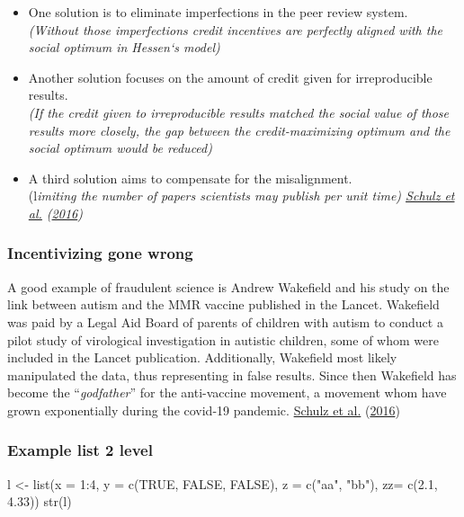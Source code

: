 \documentclass[
  12pt,
  norsk,
]{article}
\newenvironment{Shaded}{\begin{snugshade}}{\end{snugshade}}
\newcommand{\AttributeTok}[1]{\textcolor[rgb]{0.77,0.63,0.00}{#1}}
\newcommand{\ConstantTok}[1]{\textcolor[rgb]{0.00,0.00,0.00}{#1}}
\newcommand{\DecValTok}[1]{\textcolor[rgb]{0.00,0.00,0.81}{#1}}
\newcommand{\FloatTok}[1]{\textcolor[rgb]{0.00,0.00,0.81}{#1}}
\newcommand{\FunctionTok}[1]{\textcolor[rgb]{0.00,0.00,0.00}{#1}}
\newcommand{\NormalTok}[1]{#1}
\newcommand{\OtherTok}[1]{\textcolor[rgb]{0.56,0.35,0.01}{#1}}
\newcommand{\SpecialCharTok}[1]{\textcolor[rgb]{0.00,0.00,0.00}{#1}}
\newcommand{\StringTok}[1]{\textcolor[rgb]{0.31,0.60,0.02}{#1}}
\begin{document}
\begin{itemize}
\item
  One solution is to eliminate imperfections in the peer review
  system.\\
  \emph{(Without those imperfections credit incentives are perfectly
  aligned with the social optimum in Hessen`s model)}
\item
  Another solution focuses on the amount of credit given for
  irreproducible results.\\
  \emph{(If the credit given to irreproducible results matched the
  social value of those results more closely, the gap between the
  credit-maximizing optimum and the social optimum would be reduced)}
\item
  A third solution aims to compensate for the misalignment.\\
  (l\emph{imiting the number of papers scientists may publish per unit
  time) \protect\hyperlink{ref-schulz2016}{Schulz et al.}
  (\protect\hyperlink{ref-schulz2016}{2016})}
\end{itemize}

\hypertarget{incentivizing-gone-wrong}{%
\subsubsection{Incentivizing gone
wrong}\label{incentivizing-gone-wrong}}

A good example of fraudulent science is Andrew Wakefield and his study
on the link between autism and the MMR vaccine published in the Lancet.
Wakefield was paid by a Legal Aid Board of parents of children with
autism to conduct a pilot study of virological investigation in autistic
children, some of whom were included in the Lancet publication.
Additionally, Wakefield most likely manipulated the data, thus
representing in false results. Since then Wakefield has become the
``\emph{godfather}'' for the anti-vaccine movement, a movement whom have
grown exponentially during the covid-19 pandemic.
\protect\hyperlink{ref-schulz2016}{Schulz et al.}
(\protect\hyperlink{ref-schulz2016}{2016})

\hypertarget{example-list-2-level}{%
\subsubsection{Example list 2 level}\label{example-list-2-level}}

\begin{Shaded}
\begin{Highlighting}[]
\NormalTok{l }\OtherTok{\textless{}{-}} \FunctionTok{list}\NormalTok{(}\AttributeTok{x =} \DecValTok{1}\SpecialCharTok{:}\DecValTok{4}\NormalTok{, }\AttributeTok{y =} \FunctionTok{c}\NormalTok{(}\ConstantTok{TRUE}\NormalTok{, }\ConstantTok{FALSE}\NormalTok{, }\ConstantTok{FALSE}\NormalTok{), }\AttributeTok{z =} \FunctionTok{c}\NormalTok{(}\StringTok{"aa"}\NormalTok{, }\StringTok{"bb"}\NormalTok{), }\AttributeTok{zz=} \FunctionTok{c}\NormalTok{(}\FloatTok{2.1}\NormalTok{, }\FloatTok{4.33}\NormalTok{))}
\FunctionTok{str}\NormalTok{(l)}
\end{Highlighting}
\end{Shaded}
\end{document}
